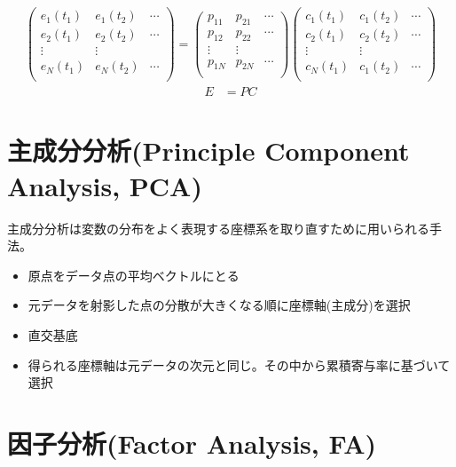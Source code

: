 \documentclass[a4paper,11pt]{jsarticle}
\begin{document}
\begin{align}
  \begin{pmatrix}
    e_1(t_1) & e_1(t_2) &\cdots\\
    e_2(t_1) & e_2(t_2) & \cdots\\
    \vdots& \vdots&\\
    e_N(t_1)& e_N(t_2) & \cdots\\
  \end{pmatrix}
  =
  \begin{pmatrix}
  p_{11} &p_{21}& \cdots\\
  p_{12} &p_{22}& \cdots\\
  \vdots &\vdots&\\
  p_{1N} &p_{2N}& \cdots\\
  \end{pmatrix}
  \begin{pmatrix}
    c_1(t_1) & c_1(t_2) & \cdots\\
    c_2(t_1) & c_2(t_2) & \cdots\\
    \vdots & \vdots& \\
    c_N(t_1) & c_1(t_2) & \cdots\\
    \end{pmatrix}
  \end{align}
  \begin{align}
    E&=PC
  \end{align}

\section{主成分分析(Principle Component Analysis, PCA)}

主成分分析は変数の分布をよく表現する座標系を取り直すために用いられる手法。

\begin{itemize}
\item 原点をデータ点の平均ベクトルにとる
\item 元データを射影した点の分散が大きくなる順に座標軸(主成分)を選択
\item 直交基底
\item 得られる座標軸は元データの次元と同じ。その中から累積寄与率に基づいて選択
\end{itemize}

\section{因子分析(Factor Analysis, FA)}
\end{document}
